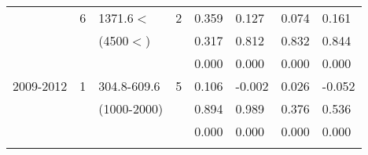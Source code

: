 \begin{table}[p]
\begin{tabular}{cclcllll}
                                                               & 6                                                              & 1371.6$<$                                                             & 2                                                                     & 0.359                                       & 0.127                                           & 0.074                                               & 0.161  \\ 
                                                               &                                                                 & (4500$<$)                                                              &                                                                        &  0.317                                      & 0.812                                           & 0.832                                               & 0.844  \\ 
                                                               &                                                                 &                                                                                &                                                                        & 0.000                                       & 0.000                                           & 0.000                                               & 0.000  \\ \hline\noalign{\smallskip}
2009-2012                                              & 1                                                              & 304.8-609.6                                                           & 5                                                                     &  0.106                                      & -0.002                                          & 0.026                                               & -0.052  \\ 
                                                               &                                                                 & (1000-2000)                                                           &                                                                        & 0.894                                      & 0.989                                            & 0.376                                               & 0.536  \\ 
                                                               &                                                                 &                                                                                &                                                                        &  0.000                                     & 0.000                                            & 0.000                                               & 0.000  \\ \cline{5-8}\noalign{\smallskip}

\end{tabular}
\end{table}
